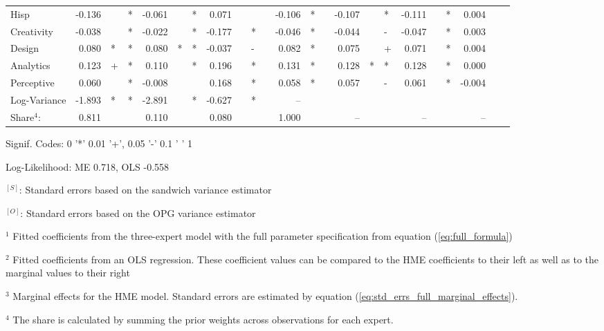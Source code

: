 \documentclass[12pt]{article}
\theoremstyle{definition}
\begin{document}
\begin{landscape}
\begin{table}
\begin{threeparttable}
\begin{tabular}[l]{l r l l r l l r l l c r l c r l l r l l r l l}
  Hisp                  & -0.136 &   & * & -0.061 &    & * &  0.071 &    &   && -0.106 & *     && -0.107 &   & *    & -0.111 &    & *   &  0.004 &   &     \\
  Creativity            & -0.038 &   & * & -0.022 &    & * & -0.177 &    & * && -0.046 & *     && -0.044 &   & -    & -0.047 &    & *   &  0.003 &   &     \\
  Design                &  0.080 & * & * &  0.080 & *  & * & -0.037 &    & - &&  0.082 & *     &&  0.075 &   & +    &  0.071 &    & *   &  0.004 &   &     \\
  Analytics             &  0.123 & + & * &  0.110 &    & * &  0.196 &    & * &&  0.131 & *     &&  0.128 & * & *    &  0.128 &    & *   &  0.000 &   &     \\
  Perceptive            &  0.060 &   & * & -0.008 &    &   &  0.168 &    & * &&  0.058 & *     &&  0.057 &   & -    &  0.061 &    & *   & -0.004 &   &     \\
  Log-Variance          & -1.893 & * & * & -2.891 &    & * & -0.627 &    & * &&  --    &       &&        &   &      &        &    &     &        &   &     \\
                        \cmidrule(l){2-4} \cmidrule(l){5-7} \cmidrule(l){8-10} \cmidrule(l){12-13} \cmidrule(l){15-17} \cmidrule(l){18-20} \cmidrule(l){21-23}
  Share$^{4}$:          & 0.811  &   &   & 0.110  &    &   &  0.080 &    &   &&  1.000 &       &&  --    &   &      &  --    &    &     &  --    &   &     \\
  \hline
        \end{tabular}
        \begin{tablenotes}
          \item Signif. Codes: 0 '*' 0.01 '+', 0.05 '-' 0.1 ' ' 1
          \item Log-Likelihood: ME 0.718, OLS -0.558
          \item $^{[S]}$: Standard errors based on the sandwich variance estimator
          \item $^{[O]}$: Standard errors based on the OPG variance estimator
          \item $^{1}$ Fitted coefficients from the three-expert model with the full parameter specification from equation (\ref{eq:full_formula})
          \item $^{2}$ Fitted coefficients from an OLS regression. These coefficient values can be compared to the HME coefficients to their left as well as to the marginal values to their right
          \item $^{3}$ Marginal effects for the HME model. Standard errors are estimated by equation (\ref{eq:std_errs_full_marginal_effects}).
          \item $^{4}$ The share is calculated by summing the prior weights across observations for each expert.
  
        \end{tablenotes} \label{tbl:3W_full_regressions_results}
      \end{threeparttable}
  \end{table}
  \end{landscape}
  
\end{document}
